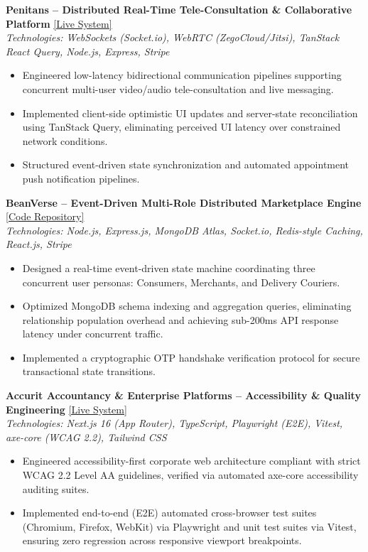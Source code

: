 \documentclass[10pt,a4paper]{article}
\begin{document}
\vspace{4pt}
\textbf{Penitans -- Distributed Real-Time Tele-Consultation \& Collaborative Platform} \hfill \href{https://penitans.com}{[Live System]} \\
\textit{Technologies: WebSockets (Socket.io), WebRTC (ZegoCloud/Jitsi), TanStack React Query, Node.js, Express, Stripe}
\begin{itemize}
    \item Engineered low-latency bidirectional communication pipelines supporting concurrent multi-user video/audio tele-consultation and live messaging.
    \item Implemented client-side optimistic UI updates and server-state reconciliation using TanStack Query, eliminating perceived UI latency over constrained network conditions.
    \item Structured event-driven state synchronization and automated appointment push notification pipelines.
\end{itemize}

\vspace{4pt}
\textbf{BeanVerse -- Event-Driven Multi-Role Distributed Marketplace Engine} \hfill \href{https://github.com/nabilroghani/bean-verse}{[Code Repository]} \\
\textit{Technologies: Node.js, Express.js, MongoDB Atlas, Socket.io, Redis-style Caching, React.js, Stripe}
\begin{itemize}
    \item Designed a real-time event-driven state machine coordinating three concurrent user personas: Consumers, Merchants, and Delivery Couriers.
    \item Optimized MongoDB schema indexing and aggregation queries, eliminating relationship population overhead and achieving sub-200ms API response latency under concurrent traffic.
    \item Implemented a cryptographic OTP handshake verification protocol for secure transactional state transitions.
\end{itemize}

\vspace{4pt}
\textbf{Accurit Accountancy \& Enterprise Platforms -- Accessibility \& Quality Engineering} \hfill \href{https://accuritaccountancy.com}{[Live System]} \\
\textit{Technologies: Next.js 16 (App Router), TypeScript, Playwright (E2E), Vitest, axe-core (WCAG 2.2), Tailwind CSS}
\begin{itemize}
    \item Engineered accessibility-first corporate web architecture compliant with strict WCAG 2.2 Level AA guidelines, verified via automated axe-core accessibility auditing suites.
    \item Implemented end-to-end (E2E) automated cross-browser test suites (Chromium, Firefox, WebKit) via Playwright and unit test suites via Vitest, ensuring zero regression across responsive viewport breakpoints.
\end{itemize}
\end{document}
